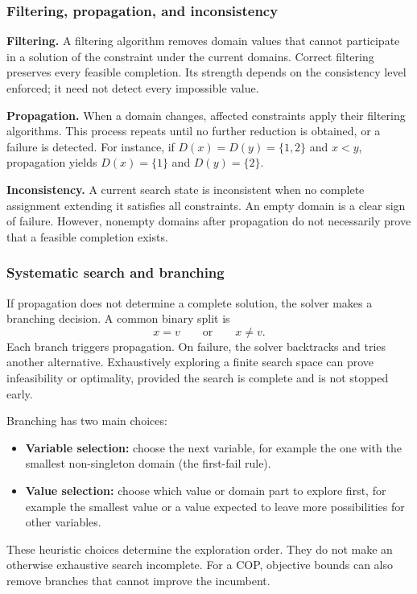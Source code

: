 \subsubsection{Filtering, propagation, and inconsistency}

\textbf{Filtering.} A filtering algorithm removes domain values that cannot
participate in a solution of the constraint under the current domains.
Correct filtering preserves every feasible completion. Its strength depends
on the consistency level enforced; it need not detect every impossible value.

\textbf{Propagation.} When a domain changes, affected constraints apply their
filtering algorithms. This process repeats until no further reduction is
obtained, or a failure is detected. For instance, if
$D(x)=D(y)=\{1,2\}$ and $x<y$, propagation yields
$D(x)=\{1\}$ and $D(y)=\{2\}$.

\textbf{Inconsistency.} A current search state is inconsistent when no complete
assignment extending it satisfies all constraints. An empty domain is a clear
sign of failure. However, nonempty domains after propagation do not necessarily
prove that a feasible completion exists.

\subsubsection{Systematic search and branching}

If propagation does not determine a complete solution, the solver makes a
branching decision. A common binary split is
\[
 x=v \qquad\text{or}\qquad x\neq v.
\]
Each branch triggers propagation. On failure, the solver backtracks and tries
another alternative. Exhaustively exploring a finite search space can prove
infeasibility or optimality, provided the search is complete and is not stopped
early.

Branching has two main choices:
\begin{itemize}
 \item \textbf{Variable selection:} choose the next variable, for example the
 one with the smallest non-singleton domain (the first-fail rule).
 \item \textbf{Value selection:} choose which value or domain part to explore
 first, for example the smallest value or a value expected to leave more
 possibilities for other variables.
\end{itemize}

These heuristic choices determine the exploration order. They do not make an
otherwise exhaustive search incomplete. For a COP, objective bounds can also
remove branches that cannot improve the incumbent.

